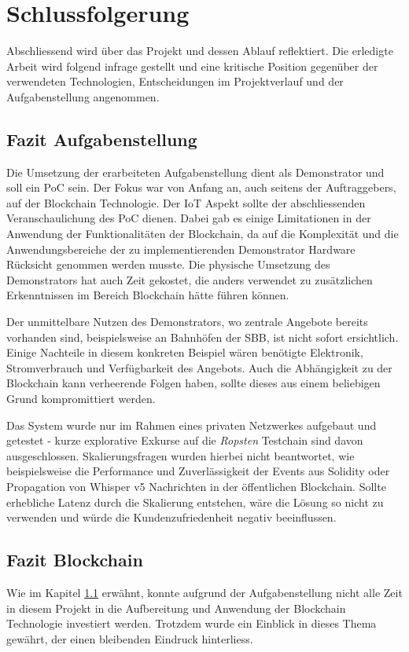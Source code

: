 \chapter{Schlussfolgerung}
\label{cha:Schlussfolgerung}

Abschliessend wird über das Projekt und dessen Ablauf reflektiert. Die erledigte Arbeit wird folgend infrage gestellt und eine kritische Position gegenüber der verwendeten Technologien, Entscheidungen im Projektverlauf und der Aufgabenstellung angenommen.

\section{Fazit Aufgabenstellung}
\label{sec:Fazit_Aufgabenstellung}
Die Umsetzung der erarbeiteten Aufgabenstellung dient als Demonstrator und soll ein \acrshort{PoC} sein. Der Fokus war von Anfang an, auch seitens der Auftraggebers, auf der Blockchain Technologie. Der \acrshort{IoT} Aspekt sollte der abschliessenden Veranschaulichung des \acrshort{PoC} dienen. Dabei gab es einige Limitationen in der Anwendung der Funktionalitäten der Blockchain, da auf die Komplexität und die Anwendungsbereiche der zu implementierenden Demonstrator Hardware Rücksicht genommen werden musste. Die physische Umsetzung des Demonstrators hat auch Zeit gekostet, die anders verwendet zu zusätzlichen Erkenntnissen im Bereich Blockchain hätte führen können.

Der unmittelbare Nutzen des Demonstrators, wo zentrale Angebote bereits vorhanden sind, beispielsweise an Bahnhöfen der SBB, ist nicht sofort ersichtlich. Einige Nachteile in diesem konkreten Beispiel wären benötigte Elektronik, Stromverbrauch und Verfügbarkeit des Angebots. Auch die Abhängigkeit zu der Blockchain kann verheerende Folgen haben, sollte dieses aus einem beliebigen Grund kompromittiert werden.

Das System wurde nur im Rahmen eines privaten Netzwerkes aufgebaut und getestet - kurze explorative Exkurse auf die \emph{Ropsten} Testchain sind davon ausgeschlossen. Skalierungsfragen wurden hierbei nicht beantwortet, wie beispielsweise die Performance und Zuverlässigkeit der Events aus Solidity oder Propagation von Whisper v5 Nachrichten in der öffentlichen Blockchain. Sollte erhebliche Latenz durch die Skalierung entstehen, wäre die Lösung so nicht zu verwenden und würde die Kundenzufriedenheit negativ beeinflussen.

\section{Fazit Blockchain}
Wie im Kapitel \ref{sec:Fazit_Aufgabenstellung} erwähnt, konnte aufgrund der Aufgabenstellung nicht alle Zeit in diesem Projekt in die Aufbereitung und Anwendung der Blockchain Technologie investiert werden. Trotzdem wurde ein Einblick in dieses Thema gewährt, der einen bleibenden Eindruck hinterliess.

